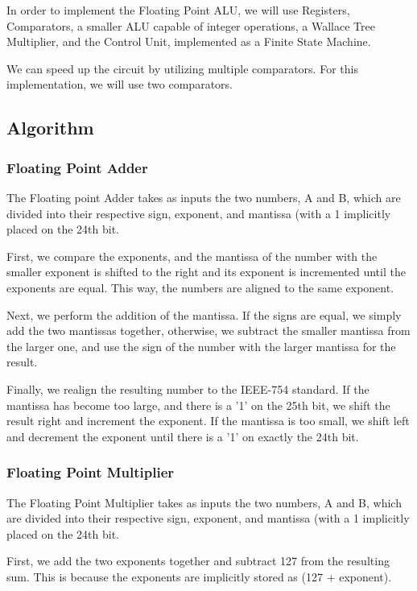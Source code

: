 \documentclass[a4paper,10pt]{article}
\begin{document}
    In order to implement the Floating Point ALU, we will use Registers, Comparators, a smaller ALU capable of integer operations, a Wallace Tree Multiplier, and the Control Unit, implemented as a Finite State Machine.

    We can speed up the circuit by utilizing multiple comparators. For this implementation, we will use two comparators.

    \subsection{Algorithm}
    \subsubsection{Floating Point Adder}
    The Floating point Adder takes as inputs the two numbers, A and B, which are divided into their respective sign, exponent, and mantissa (with a 1 implicitly placed on the 24th bit.

    First, we compare the exponents, and the mantissa of the number with the smaller exponent is shifted to the right and its exponent is incremented until the exponents are equal. This way, the numbers are aligned to the same exponent.

    Next, we perform the addition of the mantissa. If the signs are equal, we simply add the two mantissas together, otherwise, we subtract the smaller mantissa from the larger one, and use the sign of the number with the larger mantissa for the result.

    Finally, we realign the resulting number to the IEEE-754 standard. If the mantissa has become too large, and there is a '1' on the 25th bit, we shift the result right and increment the exponent. If the mantissa is too small, we shift left and decrement the exponent until there is a '1' on exactly the 24th bit.

    \subsubsection{Floating Point Multiplier}
    The Floating Point Multiplier takes as inputs the two numbers, A and B, which are divided into their respective sign, exponent, and mantissa (with a 1 implicitly placed on the 24th bit.

    First, we add the two exponents together and subtract 127 from the resulting sum. This is because the exponents are implicitly stored as (127 + exponent).
\end{document}
